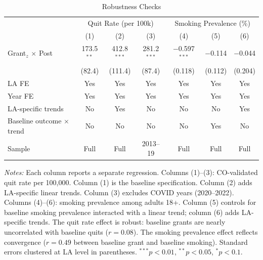 \begin{table}[t]
\centering
\caption{Robustness Checks}
\label{tab:robust}
\begin{tabular}{lcccccc}
\hline\hline
 & \multicolumn{3}{c}{Quit Rate (per 100k)} & \multicolumn{3}{c}{Smoking Prevalence (\%)} \\
 & (1) & (2) & (3) & (4) & (5) & (6) \\
\hline
Grant$_z$ $\times$ Post & 173.5$^{**}$ & 412.8$^{***}$ & 281.2$^{***}$ & $-$0.597$^{***}$ & $-$0.114 & $-$0.044 \\
 & (82.4) & (111.4) & (87.4) & (0.118) & (0.112) & (0.204) \\
\hline
LA FE & Yes & Yes & Yes & Yes & Yes & Yes \\
Year FE & Yes & Yes & Yes & Yes & Yes & Yes \\
LA-specific trends & No & Yes & No & No & No & Yes \\
Baseline outcome $\times$ trend & No & No & No & No & Yes & No \\
Sample & Full & Full & 2013--19 & Full & Full & Full \\
\hline\hline
\end{tabular}
\begin{tablenotes}
\item \textit{Notes:} Each column reports a separate regression. Columns (1)--(3): CO-validated quit rate per 100,000. Column (1) is the baseline specification. Column (2) adds LA-specific linear trends. Column (3) excludes COVID years (2020--2022). Columns (4)--(6): smoking prevalence among adults 18+. Column (5) controls for baseline smoking prevalence interacted with a linear trend; column (6) adds LA-specific trends. The quit rate effect is robust: baseline grants are nearly uncorrelated with baseline quits ($r = 0.08$). The smoking prevalence effect reflects convergence ($r = 0.49$ between baseline grant and baseline smoking). Standard errors clustered at LA level in parentheses. $^{***}p<0.01$, $^{**}p<0.05$, $^{*}p<0.1$.
\end{tablenotes}
\end{table}
